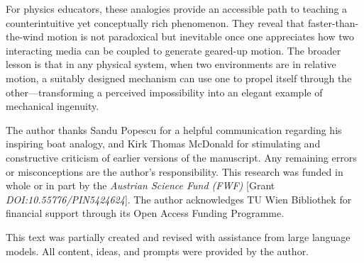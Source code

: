\documentclass[reprint,aps,pra,longbibliography]{revtex4-2}
\begin{document}
For physics educators, these analogies provide an accessible path to teaching a
counterintuitive yet conceptually rich phenomenon. They reveal that
faster-than-the-wind motion is not paradoxical but inevitable once one
appreciates how two interacting media can be coupled to generate geared-up
motion. The broader lesson is that in any physical system, when two
environments are in relative motion, a suitably designed mechanism can use one
to propel itself through the other---transforming a perceived impossibility
into an elegant example of mechanical ingenuity.

\begin{acknowledgments}
The author thanks Sandu Popescu for a helpful communication regarding his inspiring boat analogy, and Kirk Thomas McDonald for stimulating and constructive criticism of earlier versions of the manuscript. Any remaining errors or misconceptions are the author's responsibility.
This research was funded in whole or in part by the \textit{Austrian Science Fund (FWF)} [Grant \textit{DOI:10.55776/PIN5424624}].
The author acknowledges TU Wien Bibliothek for financial support through its Open Access Funding Programme.

This text was partially created and revised with assistance from large language models. All content, ideas, and prompts were provided by the author.
\end{acknowledgments}


\end{document}
